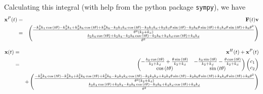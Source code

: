 \documentclass{bmcart}
\begin{document}
Calculating this integral (with help from the python package
{\tt sympy}), we have
\begin{eqnarray*}
{\bf x}^P (t) & = & {\bf F} (t) {\bf v} \\
& = & \begin{pmatrix}\frac{- k_{2}^{2} k_{4} \cos{\left(t \theta \right)} - k_{2}^{2} k_{4} + k_{2}^{2} k_{6} \cos{\left(t \theta \right)} + k_{2}^{2} k_{6} - k_{2} k_{4} k_{d} \cos{\left(t \theta \right)} - k_{2} k_{4} k_{d} + k_{2} k_{4} \theta \sin{\left(t \theta \right)} - k_{2} k_{6} \theta \sin{\left(t \theta \right)} + k_{4} k_{d} \theta \sin{\left(t \theta \right)} + k_{6} \theta^{2}}{\theta^{2} \left(k_{2} + k_{d}\right)}\\\frac{k_{2} k_{4} \cos{\left(t \theta \right)} + k_{2} k_{4} - k_{2} k_{6} \cos{\left(t \theta \right)} - k_{2} k_{6} + k_{4} k_{d} \cos{\left(t \theta \right)} + k_{4} k_{d}}{\theta^{2}}\end{pmatrix}
\end{eqnarray*}

\begin{eqnarray*}
{\bf x} (t) & = & {\bf x}^H (t) + {\bf x}^P (t) \\
& = & \begin{pmatrix}- \frac{k_{2} \cos{\left(t \theta \right)}}{k_{2} + k_{d}} + \frac{\theta \sin{\left(t \theta \right)}}{k_{2} + k_{d}} & - \frac{k_{2} \sin{\left(t \theta \right)}}{k_{2} + k_{d}} - \frac{\theta \cos{\left(t \theta \right)}}{k_{2} + k_{d}}\\\cos{\left(t \theta \right)} & \sin{\left(t \theta \right)}\end{pmatrix}  \begin{pmatrix} c_1 \\ c_2 \end{pmatrix} \\
&  & + \begin{pmatrix}\frac{- k_{2}^{2} k_{4} \cos{\left(t \theta \right)} - k_{2}^{2} k_{4} + k_{2}^{2} k_{6} \cos{\left(t \theta \right)} + k_{2}^{2} k_{6} - k_{2} k_{4} k_{d} \cos{\left(t \theta \right)} - k_{2} k_{4} k_{d} + k_{2} k_{4} \theta \sin{\left(t \theta \right)} - k_{2} k_{6} \theta \sin{\left(t \theta \right)} + k_{4} k_{d} \theta \sin{\left(t \theta \right)} + k_{6} \theta^{2}}{\theta^{2} \left(k_{2} + k_{d}\right)}\\\frac{k_{2} k_{4} \cos{\left(t \theta \right)} + k_{2} k_{4} - k_{2} k_{6} \cos{\left(t \theta \right)} - k_{2} k_{6} + k_{4} k_{d} \cos{\left(t \theta \right)} + k_{4} k_{d}}{\theta^{2}}\end{pmatrix}
\end{eqnarray*}
\end{document}
